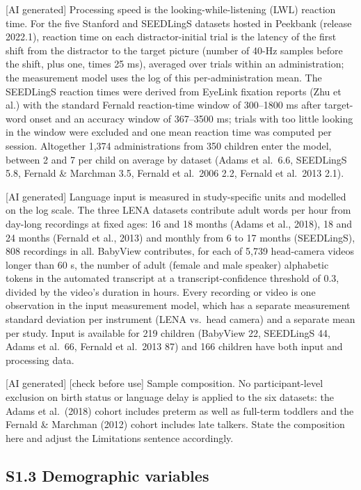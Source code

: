 [AI generated] Processing speed is the looking-while-listening (LWL) reaction
time. For the five Stanford and SEEDLingS datasets hosted in Peekbank (release
2022.1), reaction time on each distractor-initial trial is the latency of the
first shift from the distractor to the target picture (number of 40-Hz samples
before the shift, plus one, times 25 ms), averaged over trials within an
administration; the measurement model uses the log of this per-administration
mean. The SEEDLingS reaction times were derived from EyeLink fixation reports
(Zhu et al.) with the standard Fernald reaction-time window of 300--1800 ms after
target-word onset and an accuracy window of 367--3500 ms; trials with too little
looking in the window were excluded and one mean reaction time was computed per
session. Altogether 1,374 administrations from 350 children enter the model,
between 2 and 7 per child on average by dataset (Adams et al.\ 6.6, SEEDLingS 5.8,
Fernald \& Marchman 3.5, Fernald et al.\ 2006 2.2, Fernald et al.\ 2013 2.1).

[AI generated] Language input is measured in study-specific units and modelled on
the log scale. The three LENA datasets contribute adult words per hour from
day-long recordings at fixed ages: 16 and 18 months (Adams et al., 2018), 18 and
24 months (Fernald et al., 2013) and monthly from 6 to 17 months (SEEDLingS), 808
recordings in all. BabyView contributes, for each of 5,739 head-camera videos
longer than 60 s, the number of adult (female and male speaker) alphabetic tokens
in the automated transcript at a transcript-confidence threshold of 0.3, divided
by the video's duration in hours. Every recording or video is one observation in
the input measurement model, which has a separate measurement standard deviation
per instrument (LENA vs.\ head camera) and a separate mean per study. Input is
available for 219 children (BabyView 22, SEEDLingS 44, Adams et al.\ 66, Fernald
et al.\ 2013 87) and 166 children have both input and processing data.

[AI generated] [check before use] Sample composition. No participant-level
exclusion on birth status or language delay is applied to the six datasets: the
Adams et al.\ (2018) cohort includes preterm as well as full-term toddlers and the
Fernald \& Marchman (2012) cohort includes late talkers. State the composition
here and adjust the Limitations sentence accordingly.

\subsection*{S1.3 Demographic variables}

